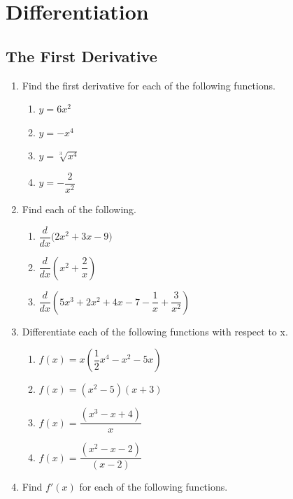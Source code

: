 \documentclass{report}
\begin{document}
\chapter{Differentiation}
\begin{multicols}{2}
      \section{The First Derivative}
      \begin{enumerate}
            \item Find the first derivative for each of the following functions.
                  \begin{enumerate}
                        \item $y = 6x^2$
                        \item $y = -x^4$
                        \item $y = \sqrt[3]{x^4}$
                        \item $y = -\dfrac{2}{x^2}$
                  \end{enumerate}
            \item Find each of the following.
                  \begin{enumerate}
                        \item ${\dfrac{d}{d x}}\Big(2x^{2}+3x-9{\Big)}$
                        \item ${\dfrac{d}{d x}}\left(x^{2}+{\dfrac{2}{x}}\right)$
                        \item ${\dfrac{d}{d x}}\left(5x^{3}+2x^{2}+4x-7-{\dfrac{1}{x}}+{\dfrac{3}{x^{2}}}\right)$
                  \end{enumerate}
            \item Differentiate each of the following functions with respect to x.
                  \begin{enumerate}
                        \item $f(x)=x\left({\dfrac{1}{2}}x^{4}-x^{2}-5x\right)$
                        \item $f(x)=(x^{2}-5)(x+3)$
                        \item $f(x)={\dfrac{(x^{3}-x+4)}{x}}$
                        \item $f(x)={\dfrac{(x^{2}-x-2)}{(x-2)}}$
                  \end{enumerate}
            \item Find $f'(x)$ for each of the following functions.
                  \begin{enumerate}

\end{enumerate}
\end{enumerate}
\end{multicols}
\end{document}
